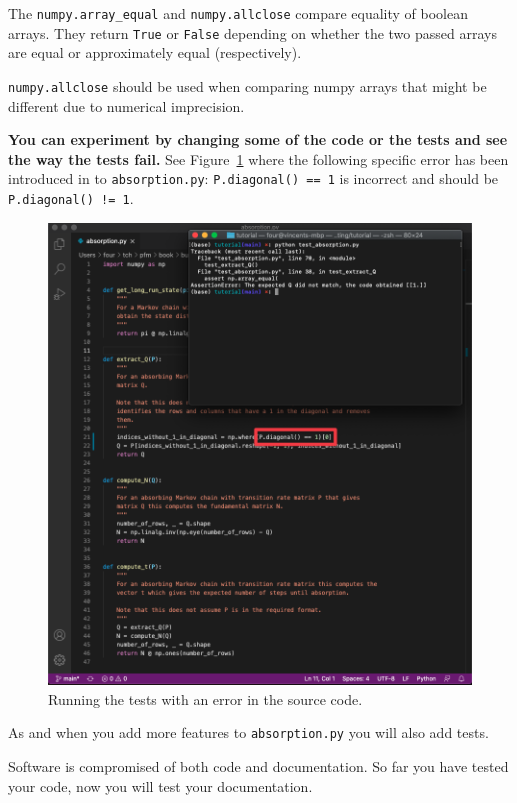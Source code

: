 \begin{note}
The \texttt{numpy.array\_equal} and \texttt{numpy.allclose} compare equality of
boolean arrays. They return \texttt{True} or \texttt{False} depending on whether the two
passed arrays are equal or approximately equal (respectively).

\texttt{numpy.allclose} should be used when comparing numpy arrays that might be
different due to numerical imprecision.
\end{note}



\textbf{You can experiment by changing some of the code or the tests and see the way
the tests fail.} See Figure~\ref{fig:running_tests_with_errors_in_source_code}
where the following specific error has been introduced in to \texttt{absorption.py}:
\texttt{P.diagonal() == 1} is incorrect and should be \texttt{P.diagonal() != 1}.

\begin{figure}[htbp]
\centering

\includegraphics[width=0.750\linewidth]{./assets/running_tests_with_error_in_source_code/main.png}
\caption{Running the tests with an error in the source code.}
\label{fig:running_tests_with_errors_in_source_code}
\end{figure}


As and when you add more features to \texttt{absorption.py} you will also add tests.


Software is compromised of both code and documentation. So far you have tested
your code, now you will test your documentation.


